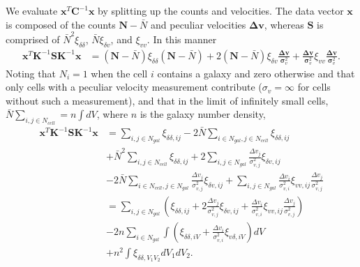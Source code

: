 \documentclass{article}
\begin{document}
We evaluate $\textbf{x}^T \textbf{C}^{-1}\textbf{x}$ by splitting up the counts and velocities.  The data vector $\textbf{x}$ is composed of the counts
 $\textbf{N}-\bar{N}$ and peculiar velocities $\mathbf{\Delta v}$, whereas $\textbf{S}$ is comprised of $\bar{N}^2\xi_{\delta\delta}$, $\bar{N}\xi_{\delta v}$,
and $\xi_{vv}$.  In this manner
\begin{align}
\textbf{x}^T \textbf{K}^{-1}\textbf{S}\textbf{K}^{-1} \textbf{x}& = (\textbf{N}-\bar{N}) \xi_{\delta\delta}  (\textbf{N}-\bar{N})  + 2  (\textbf{N}-\bar{N}) \xi_{\delta v}\frac{\mathbf{\Delta v}}{\bm{\sigma}_v^2}+ 
\frac{\mathbf{\Delta v}}{\bm{\sigma}_v^2} \xi_{vv}\frac{\mathbf{\Delta v}}{\bm{\sigma}_v^2}.
\end{align}
Noting that $N_i=1$ when the cell $i$ contains a galaxy and zero otherwise and that only cells with a peculiar velocity measurement contribute ($\sigma_v =\infty$
for cells without such a measurement), and that in the limit of infinitely small cells, $\bar{N}\sum_{i,j\in N_{cell}} = n \int dV$, where $n$ is the galaxy number density,
\begin{align*}
\textbf{x}^T \textbf{K}^{-1}\textbf{S}\textbf{K}^{-1} \textbf{x}& = \sum_{i,j\in N_{gal}} \xi_{\delta\delta,ij} -2 \bar{N} \sum_{i\in N_{gal},j\in N_{cell}} \xi_{\delta\delta,ij}\\
& +\bar{N}^2  \sum_{i,j\in N_{cell}}  \xi_{\delta\delta,ij} + 2 \sum_{i,j\in N_{gal}} \frac{\Delta v_j}{\sigma_{v,j}^2} \xi_{\delta v,ij} \\
& -2\bar{N}\sum_{i\in N_{cell}, j\in N_{gal}} \frac{\Delta v_j}{\sigma_{v,j}^2} \xi_{\delta v,ij}  + \sum_{i,j\in N_{gal}} \frac{\Delta v_i}{\sigma_{v,i}^2} \xi_{vv,ij} \frac{\Delta v_j}{\sigma_{v,j}^2}\\
& = \sum_{i,j\in N_{gal}} \left( \xi_{\delta\delta,ij} + 2  \frac{\Delta v_j}{\sigma_{v,j}^2} \xi_{\delta v,ij} + \frac{\Delta v_i}{\sigma_{v,i}^2} \xi_{vv,ij} \frac{\Delta v_j}{\sigma_{v,j}^2}\right)\\
&-2 n \sum_{i\in N_{gal}}\int \left(\xi_{\delta\delta,iV} + \frac{\Delta v_i}{\sigma_{v,i}^2} \xi_{v \delta,iV}\right) dV\\
& +n^2  \int \xi_{\delta\delta,V_1V_2}dV_1dV_2.
\end{align*}
\end{document}
